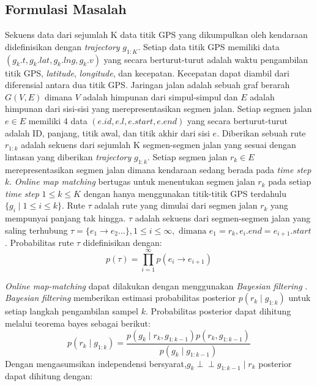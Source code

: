 \subsection{Formulasi Masalah}
\label{subsec:omm-preliminaries}
Sekuens data dari sejumlah K data titik GPS yang dikumpulkan oleh kendaraan didefinisikan dengan \textit{trajectory} $g_{1:K}$. Setiap data titik GPS memiliki data $(g_k.t,g_k.lat,g_k.lng,g_k.v)$ yang secara berturut-turut adalah waktu pengambilan titik GPS, \textit{latitude}, \textit{longitude}, dan kecepatan. Kecepatan dapat diambil dari diferensial antara dua titik GPS. Jaringan jalan adalah sebuah graf berarah $G(V,E)$ dimana $V$ adalah himpunan dari simpul-simpul dan $E$ adalah himpunan dari sisi-sisi yang merepresentasikan segmen jalan. Setiap segmen jalan $e\in E$ memiliki 4 data $(e.id, e.l, e.start, e.end)$ yang secara berturut-turut adalah ID, panjang, titik awal, dan titik akhir dari sisi $e$. Diberikan sebuah rute $r_{1:k}$ adalah sekuens dari sejumlah K segmen-segmen jalan yang sesuai dengan lintasan yang diberikan \textit{trajectory} $g_{1:k}$. Setiap segmen jalan $r_k\in E$ merepresentasikan segmen jalan dimana kendaraan sedang berada pada \textit{time step} $k$. \textit{Online map matching} bertugas untuk menentukan segmen jalan $r_k$ pada setiap \textit{time step} $1\leq k \leq K$ dengan hanya menggunakan titik-titik GPS terdahulu $\{g_i\mid 1\leq i\leq k\}$. Rute $\tau$ adalah rute yang dimulai dari segmen jalan $r_k$ yang mempunyai panjang tak hingga. $\tau$ adalah sekuens dari segmen-segmen jalan yang saling terhubung $\tau=\{e_1\rightarrow e_2\ldots\}, 1 \leq i \leq \infty, \text{ dimana } e_1=r_k, e_i.end=e_{i+1}.start$. Probabilitas rute $\tau$ didefinisikan dengan:
\begin{equation}
    p(\tau)=\prod_{i=1}^{\infty}p(e_i\rightarrow e_{i+1})
\end{equation}

\textit{Online map-matching} dapat dilakukan dengan menggunakan \textit{Bayesian filtering} \cite{Taguchi2019}. \textit{Bayesian filtering} memberikan estimasi probabilitas posterior $p(r_k\mid g_{1:k})$ untuk setiap langkah pengambilan sampel $k$. Probabilitas posterior dapat dihitung melalui teorema bayes sebagai berikut:
\begin{equation}
    p(r_k\mid g_{1:k})=\frac{p(g_k\mid r_k,g_{1:k-1})p(r_k,g_{1:k-1})}{p(g_k\mid g_{1:k-1})}
\end{equation}
Dengan mengasumsikan independensi bersyarat,$g_k \perp\!\!\!\perp g_{1:k-1} \mid r_k $ posterior dapat dihitung dengan:

